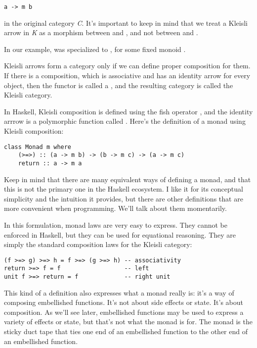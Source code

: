 \begin{verbatim}
a -> m b
\end{verbatim}
in the original category \emph{C}. It's important to keep in mind that
we treat a Kleisli arrow in \emph{K} as a morphism between 
and , and not between  and .

In our example,  was specialized to , for
some fixed monoid .

Kleisli arrows form a category only if we can define proper composition
for them. If there is a composition, which is associative and has an
identity arrow for every object, then the functor  is called a
, and the resulting category is called the Kleisli category.

In Haskell, Kleisli composition is defined using the fish operator
\code{>=>}, and the identity arrrow is a
polymorphic function called . Here's the definition of a
monad using Kleisli composition:

\begin{verbatim}
class Monad m where 
    (>=>) :: (a -> m b) -> (b -> m c) -> (a -> m c)
    return :: a -> m a
\end{verbatim}
Keep in mind that there are many equivalent ways of defining a monad,
and that this is not the primary one in the Haskell ecosystem. I like it
for its conceptual simplicity and the intuition it provides, but there
are other definitions that are more convenient when programming. We'll
talk about them momentarily.

In this formulation, monad laws are very easy to express. They cannot be
enforced in Haskell, but they can be used for equational reasoning. They
are simply the standard composition laws for the Kleisli category:

\begin{verbatim}
(f >=> g) >=> h = f >=> (g >=> h) -- associativity
return >=> f = f                  -- left
unit f >=> return = f             -- right unit
\end{verbatim}
This kind of a definition also expresses what a monad really is: it's a
way of composing embellished functions. It's not about side effects or
state. It's about composition. As we'll see later, embellished functions
may be used to express a variety of effects or state, but that's not
what the monad is for. The monad is the sticky duct tape that ties one
end of an embellished function to the other end of an embellished
function.

